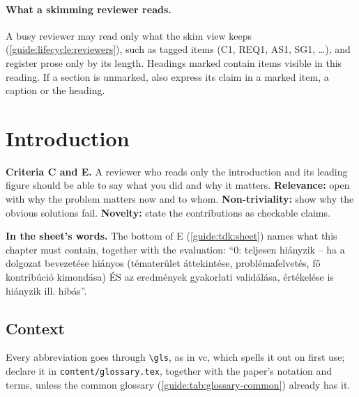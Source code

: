 \paragraph{What a skimming reviewer reads.} A busy reviewer may read only what the skim view keeps (\cref{guide:lifecycle:reviewers}), such as tagged items (C1, REQ1, AS1, SG1, \dots), and register prose only by its length. Headings marked \skimmark{} contain items visible in this reading. If a section is unmarked, also express its claim in a marked item, a caption or the heading.

\section{Introduction}\label{guide:chapters:intro}
\textbf{Criteria C and E.} A reviewer who reads only the introduction and its leading figure should be able to say what you did and why it matters.
\textbf{Relevance:} open with why the problem matters now and to whom.
\textbf{Non-triviality:} show why the obvious solutions fail.
\textbf{Novelty:} state the contributions as checkable claims.

\textbf{In the sheet's words.} The bottom of E (\cref{guide:tdk:sheet}) names what this chapter must contain, together with the evaluation: \enquote{0: teljesen hiányzik -- ha a dolgozat bevezetése hiányos (tématerület áttekintése, problémafelvetés, fő kontribúció kimondása) ÉS az eredmények gyakorlati validálása, értékelése is hiányzik ill. hibás}.

\subsection{Context}\label{guide:chapters:context}
Every abbreviation goes through \texttt{\textbackslash gls}, as in \gls{vc}, which spells it out on first use; declare it in \texttt{content/glossary.tex}, together with the paper's notation and terms, unless the common glossary (\cref{guide:tab:glossary-common}) already has it.


